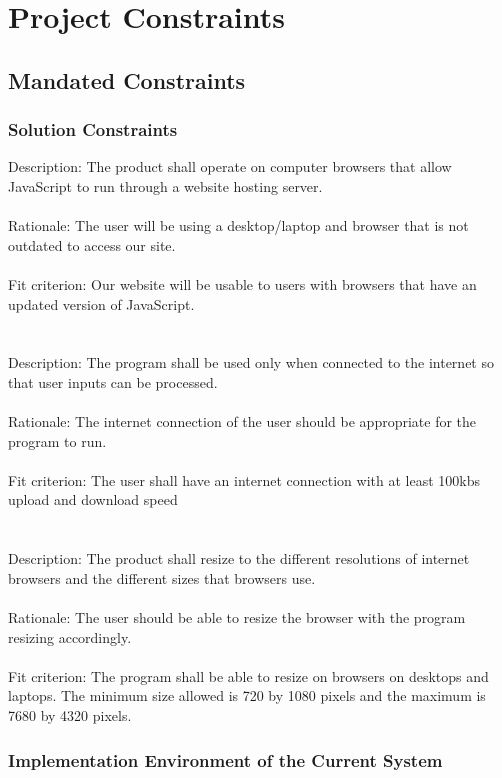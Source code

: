 \documentclass[11pt, oneside]{article}
\begin{document}
\newpage
\section{Project Constraints}
\subsection{Mandated Constraints}
\subsubsection{Solution Constraints}
Description: The product shall operate on computer browsers that allow JavaScript to run through a website hosting server.
\\
\\
Rationale: The user will be using a desktop/laptop and browser that is not outdated to access our site.
\\
\\
Fit criterion: Our website will be usable to users with browsers that have an updated version of JavaScript.
\\
\\
\\
Description: The program shall be used only when connected to the internet so that user inputs can be processed.
\\
\\
Rationale: The internet connection of the user should be appropriate for the program to run.
\\
\\
Fit criterion: The user shall have an internet connection with at least 100kbs upload and download speed
\\
\\
\\
Description: The product shall resize to the different resolutions of internet browsers and the different sizes that browsers use.
\\
\\
Rationale: The user should be able to resize the browser with the program resizing accordingly.
\\
\\
Fit criterion: The program shall be able to resize on browsers on desktops and laptops. The minimum size allowed is 720 by 1080 pixels and the maximum is 7680 by 4320 pixels.

\subsubsection{Implementation Environment of the Current System}
\end{document}
